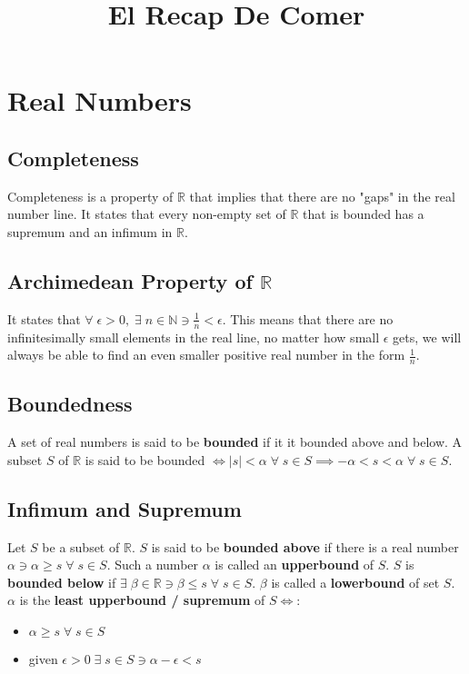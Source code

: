 \documentclass[12pt, a4paper]{article}
\title{El Recap De Comer}
\newcommand{\ex}{\; \exists \;}
\newcommand{\real}{\mathbb{R}}
\newcommand{\nat}{\mathbb{N}}
\newcommand{\all}{\; \forall \;}
\begin{document}
\maketitle

\section{Real Numbers}

\subsection{Completeness}
Completeness is a property of $\mathbb{R}$ that implies that there are no
"gaps" in the real number line. It states that every non-empty set of 
$\real$ that is bounded has a supremum and an infimum in $\real$. 

\subsection{Archimedean Property of $\real$}
It states that $\forall \; \epsilon > 0, \ex n \in \nat \ni \frac{1}{n}
< \epsilon$.
This means that there are no infinitesimally small elements in the real
line, no matter how small $\epsilon$ gets, we will always be able to find
an even smaller positive real number in the form $\frac{1}{n}$.

\subsection{Boundedness}
A set of real numbers is said to be \textbf{bounded} if it it bounded
above and below. A subset $S$ of $\real$ is said to be bounded $\iff
|s| < \alpha \all s \in S \implies -\alpha < s < \alpha \all s \in S$.

\subsection{Infimum and Supremum}
Let $S$ be a subset of $\mathbb{R}$. $S$ is said to be \textbf{bounded above}
if there is a real number $\alpha \ni \alpha \geq s \; \forall \; s \in S$.
Such a number $\alpha$ is called an \textbf{upperbound} of $S$.
$S$ is \textbf{bounded below} if $\exists \; \beta \in \mathbb{R} \ni \beta
\leq s \; \forall \; s \in S$. $\beta$ is called a \textbf{lowerbound} of
set $S$. \\

$\alpha$ is the \textbf{least upperbound / supremum} of $S \iff$:
\begin{itemize}
  \item $\alpha \geq s \; \forall \; s \in S$
  \item given $\epsilon > 0 \ex s \in S \ni \alpha - \epsilon < s$ 
\end{itemize}
\end{document}
